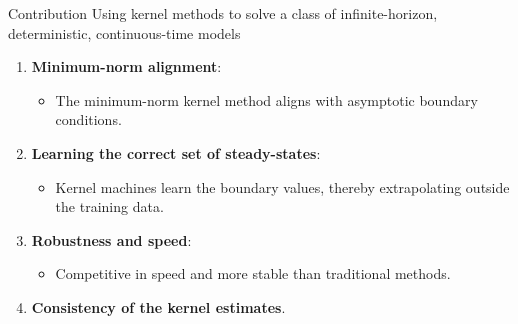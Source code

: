 \documentclass[aspectratio=169,10pt]{beamer}
\newcommand{\emphcolor}[1]{\textbf{\textcolor{emphcolorval}{#1}}}
\begin{document}
\begin{frame}{Contribution}
 Using kernel methods to solve a class of infinite-horizon, deterministic, continuous-time models
\begin{enumerate}

	\item \emphcolor{Minimum-norm alignment}:
	\begin{itemize}
		\item The minimum-norm kernel method aligns with asymptotic boundary conditions.
	\end{itemize}
	\vspace{0.1in}
	\item \emphcolor{Learning the correct set of steady-states}:
	\begin{itemize}
		\item Kernel machines learn the boundary values, thereby extrapolating outside the training data.
	\end{itemize}
	\vspace{0.1in}
	\item \emphcolor{Robustness and speed}:
	\begin{itemize}
		\item Competitive in speed and more stable than traditional methods.
	\end{itemize}
	\vspace{0.1in}
	\item \emphcolor{Consistency of the kernel estimates}.
\end{enumerate}

\end{frame}
\end{document}
